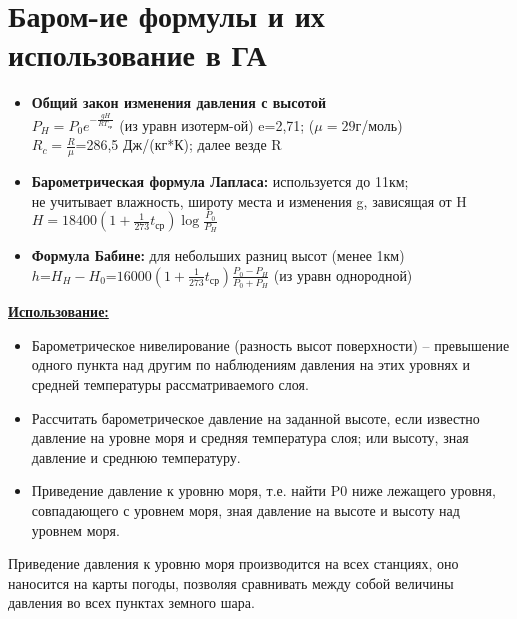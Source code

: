
\section{Баром-ие формулы и их использование в ГА}
\begin{itemize}
	\item \textbf{Общий закон изменения давления с высотой}\\
	$P_{H}=P_{0}e^{-\frac{gH}{RT_{\text{ср}}}}$  (из уравн изотерм-ой)
	e=2,71; ($\mu=29$г/моль)\\
	$R_c=\frac{R}{\mu}$=286,5 Дж/(кг*К); далее везде R\\
	\item \textbf{Барометрическая формула Лапласа:}  используется до 11км;\\
	не учитывает влажность, широту места и изменения g, зависящая от H\\
	$ H=18400(1+\frac{1}{273} t_\text {ср})\log \frac{P_{0}}{P_{H}}$
	\item \textbf{Формула Бабине:} для небольших разниц высот (менее 1км)\\
	$h$=$H_{H}-H_{0}$=$16000(1+\frac{1}{273} t_\text {ср})\frac{P_{0}-P_{H}}{P_{0}+P_{H}}$ (из уравн однородной)
\end{itemize}
\underline{\textbf{Использование:}}
\begin{itemize}
	\item Барометрическое нивелирование (разность высот поверхности) – превышение одного пункта над другим по наблюдениям давления на этих уровнях и средней температуры рассматриваемого слоя.
	\item Рассчитать барометрическое давление на заданной высоте, если известно давление на уровне моря и средняя температура слоя; или высоту, зная давление и среднюю температуру.
	\item Приведение давление к уровню моря, т.е. найти P0 ниже лежащего уровня, совпадающего с уровнем моря, зная давление на высоте и высоту над уровнем моря.
\end{itemize}
\par Приведение давления к уровню моря производится на всех станциях, оно наносится на карты погоды, позволяя сравнивать между собой величины давления во всех пунктах земного шара.
